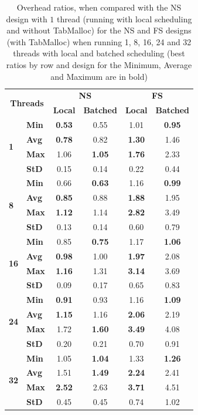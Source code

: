 \documentclass{llncs}
\begin{document}
\setlength{\tabcolsep}{12pt}
\begin{table}[!ht]
\centering
\caption{Overhead ratios, when compared with the NS design with $1$
  thread (running with local scheduling and without TabMalloc) for the
  NS and FS designs (with TabMalloc) when running 1, 8, 16, 24 and 32
  threads with local and batched scheduling (best ratios by row and
  design for the Minimum, Average and Maximum are in bold)}
\begin{tabular}{ll||cc|cc}
\multicolumn{2}{c||}{\multirow{2}{*}{\bf Threads}} &
\multicolumn{2}{c|}{\multirow{1}{*}{\bf NS}} &
\multicolumn{2}{|c}{\multirow{1}{*}{\bf FS}}\\ \cline{3-6}
& 
& \multicolumn{1}{c}{\bf Local}
& \multicolumn{1}{c}{\bf Batched}
& \multicolumn{1}{|c}{\bf Local}
& \multicolumn{1}{c}{\bf Batched}\\
\hline\hline
\multirow{4}{*}{\bf 1}
& {\bf Min }& {\bf 0.53}& 0.55& 1.01& {\bf 0.95}\\
& {\bf Avg }& {\bf 0.78}& 0.82& {\bf 1.30}& 1.46\\
& {\bf Max }& 1.06& {\bf 1.05}& {\bf 1.76}& 2.33\\
& {\bf StD }& 0.15& 0.14& 0.22& 0.44\\
\hline
\multirow{4}{*}{\bf 8}
& {\bf Min }& 0.66& {\bf 0.63}& 1.16&{\bf  0.99}\\
& {\bf Avg }& {\bf 0.85}& 0.88& {\bf 1.88}& 1.95\\
& {\bf Max }& {\bf 1.12}& 1.14& {\bf 2.82}& 3.49\\
& {\bf StD }& 0.13& 0.14& 0.60& 0.79\\
\hline
\multirow{4}{*}{\bf 16}
& {\bf Min }& 0.85& {\bf 0.75}& 1.17& {\bf 1.06}\\
& {\bf Avg }& {\bf 0.98}& 1.00& {\bf 1.97}& 2.08\\
& {\bf Max }& {\bf 1.16}& 1.31& {\bf 3.14}& 3.69\\
& {\bf StD }& 0.09& 0.17& 0.65& 0.83\\
\hline
\multirow{4}{*}{\bf 24}
& {\bf Min }& {\bf 0.91}& 0.93& 1.16& {\bf 1.09}\\
& {\bf Avg }& {\bf 1.15}& 1.16& {\bf 2.06}& 2.19\\
& {\bf Max }& 1.72& {\bf 1.60}& {\bf 3.49}& 4.08\\
& {\bf StD }& 0.20& 0.21& 0.70& 0.91\\
\hline
\multirow{4}{*}{\bf 32}
& {\bf Min }& 1.05& {\bf 1.04}& 1.33& {\bf 1.26}\\
& {\bf Avg }& 1.51& {\bf 1.49}& {\bf 2.24}& 2.41\\
& {\bf Max }& {\bf 2.52}& 2.63& {\bf 3.71}& 4.51\\
& {\bf StD }& 0.45& 0.45& 0.74& 1.02\\
\end{tabular}
\label{tab_batched_overhead}
\end{table}
\end{document}
